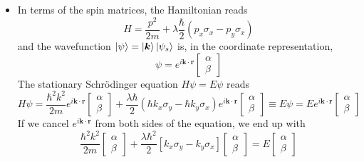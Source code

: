 \documentclass[11pt, a4paper]{article}
\newcommand{\schro}{Schr\"{o}dinger\xspace}
\renewcommand{\vec}[1]{\bm{#1}} %
\renewcommand{\k}{\vec{k}}  %
\begin{document}
\begin{itemize}
	\item In terms of the spin matrices, the Hamiltonian reads
	\begin{equation*}
		H = \frac{p^{2}}{2m} + \lambda \frac{\hbar}{2}(p_{x}\sigma_{x} - p_{y}\sigma_{x})
	\end{equation*} 
	and the wavefunction $  \ket{\psi} = \ket{\vec{k}}\ket{\psi_{s}} $ is, in the coordinate representation,
	\begin{equation*}
		\psi = e^{i\vec{k}\cdot \vec{r}} 
		\begin{bmatrix}
		\alpha\\
		\beta
		\end{bmatrix}
	\end{equation*}
	The stationary \schro equation $ H \psi = E \psi $ reads
	\begin{equation*}
		H \psi = \frac{\hbar^{2}k^{2}}{2m} e^{i\k \cdot \vec{r}}
		\begin{bmatrix}
			\alpha\\
			\beta
		\end{bmatrix}
		+ \frac{\lambda \hbar}{2}\left(\hbar k_{x}\sigma_{y} - \hbar k_{y}\sigma_{x}\right)
		e^{i\k \cdot \vec{r}}
		\begin{bmatrix}
			\alpha\\
			\beta
		\end{bmatrix}
		\equiv E \psi = E e^{i\k \cdot \vec{r}}
		\begin{bmatrix}
			\alpha\\
			\beta
		\end{bmatrix}
	\end{equation*}
	If we cancel $ e^{i\k \cdot \vec{r}} $ from both sides of the equation, we end up with
	\begin{equation*}
		\frac{\hbar^{2}k^{2}}{2m}
		\begin{bmatrix}
			\alpha\\
			\beta
		\end{bmatrix} + 
		\frac{\lambda\hbar^{2}}{2}	
		\left[k_{x}\sigma_{y} - k_{y}\sigma_{x}\right]
		\begin{bmatrix}
			\alpha\\
			\beta
		\end{bmatrix}
		 = E
		\begin{bmatrix}
			\alpha\\
			\beta
		\end{bmatrix}
	\end{equation*}
	

\end{itemize}
\end{document}
